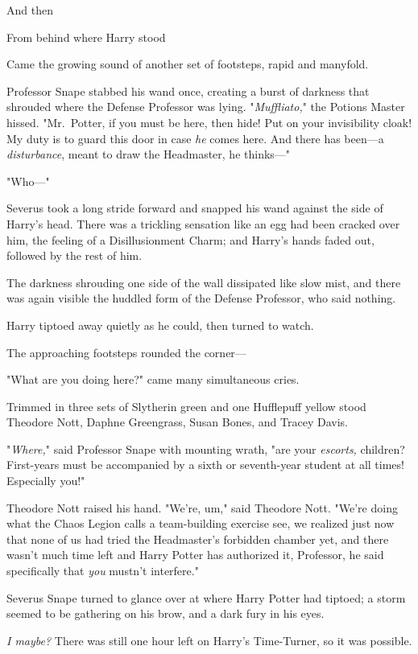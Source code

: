 And then{\el}

From behind where Harry stood{\el}

Came the growing sound of another set of footsteps, rapid and manyfold.

Professor Snape stabbed his wand once, creating a burst of darkness that
shrouded where the Defense Professor was lying. "\emph{Muffliato,}" the Potions
Master hissed. "Mr.~Potter, if you must be here, then hide! Put on your
invisibility cloak! My duty is to guard this door in case \emph{he} comes here.
And there has been—a \emph{disturbance}, meant to draw the Headmaster, he
thinks—"

"Who—"

Severus took a long stride forward and snapped his wand against the side of
Harry's head. There was a trickling sensation like an egg had been cracked over
him, the feeling of a Disillusionment Charm; and Harry's hands faded out,
followed by the rest of him.

The darkness shrouding one side of the wall dissipated like slow mist, and
there was again visible the huddled form of the Defense Professor, who said
nothing.

Harry tiptoed away quietly as he could, then turned to watch.

The approaching footsteps rounded the corner—

"What are you doing here?" came many simultaneous cries.

Trimmed in three sets of Slytherin green and one Hufflepuff yellow stood
Theodore Nott, Daphne Greengrass, Susan Bones, and Tracey Davis.

"\emph{Where,}" said Professor Snape with mounting wrath, "are your
\emph{escorts,} children? First-years must be accompanied by a sixth or
seventh-year student at all times! Especially you!"

Theodore Nott raised his hand. "We're, um," said Theodore Nott. "We're doing
what the Chaos Legion calls a team-building exercise{\el} see, we realized
just now that none of us had tried the Headmaster's forbidden chamber yet, and
there wasn't much time left{\el} and Harry Potter has authorized it,
Professor, he said specifically that \emph{you} mustn't interfere."

Severus Snape turned to glance over at where Harry Potter had tiptoed; a storm
seemed to be gathering on his brow, and a dark fury in his eyes.

\emph{I{\el} maybe?} There was still one hour left on Harry's Time-Turner,
so it was possible.

